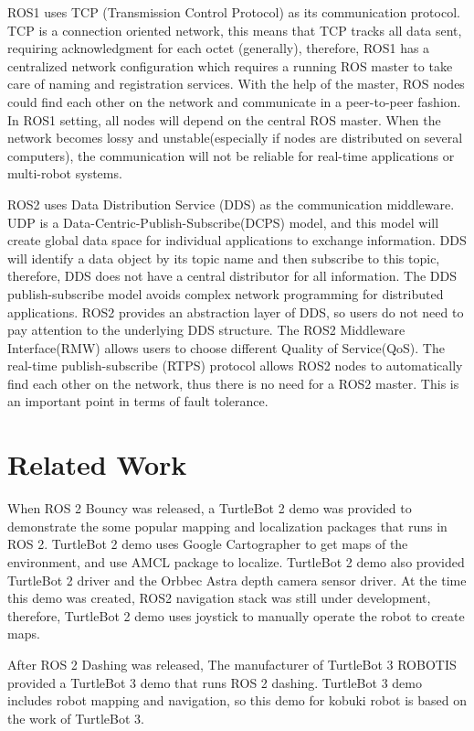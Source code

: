 \documentclass[letterpaper, 10 pt, conference]{ieeeconf}  %
\begin{document}
ROS1 uses TCP (Transmission Control Protocol) as its communication protocol. TCP is a connection oriented network, this means that TCP tracks all data sent, requiring acknowledgment for each octet (generally), therefore,  ROS1 has a centralized network configuration which requires a running ROS master to take care of naming and registration services. With the help of the master, ROS nodes could find each other on the network and communicate in a peer-to-peer fashion. In ROS1 setting, all nodes will depend on the central ROS master. When the network becomes lossy and unstable(especially if nodes are distributed on several computers), the communication will not be reliable for real-time applications or multi-robot systems.

ROS2 uses Data Distribution Service (DDS) as the communication middleware. UDP is a Data-Centric-Publish-Subscribe(DCPS) model, and this model will create global data space for individual applications to exchange information. DDS will identify a data object by its topic name and then subscribe to this topic, therefore, DDS does not have a central distributor for all information. The DDS publish-subscribe model avoids complex network programming for distributed applications.  ROS2 provides an abstraction layer of DDS, so users do not need to pay attention to the underlying DDS structure. The ROS2 Middleware Interface(RMW) allows users to choose different Quality of Service(QoS). The real-time publish-subscribe (RTPS) protocol allows ROS2 nodes to automatically find each other on the network, thus there is no need for a ROS2 master. This is an important point in terms of fault tolerance.
\section{Related Work}
When ROS 2 Bouncy was released, a TurtleBot 2 demo was provided to demonstrate the some popular mapping and localization packages that runs in ROS 2. TurtleBot 2 demo uses Google Cartographer to get maps of the environment, and use AMCL package to localize. TurtleBot 2 demo also provided TurtleBot 2 driver and the Orbbec Astra depth camera sensor driver. At the time this demo was created, ROS2 navigation stack was still under development, therefore, TurtleBot 2 demo uses joystick to manually operate the robot to create maps. 

After ROS 2 Dashing was released, The manufacturer of TurtleBot 3 ROBOTIS\cite{c5} provided a TurtleBot 3 demo that runs ROS 2 dashing. TurtleBot 3 demo includes robot mapping and navigation, so this demo for kobuki robot is based on the work of TurtleBot 3. 
\end{document}
